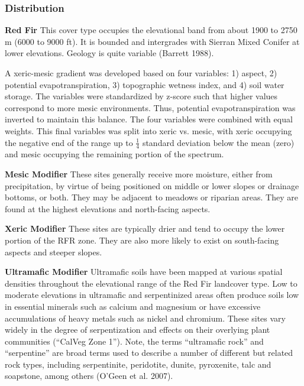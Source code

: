 \subsubsection{Distribution}

\textbf{Red Fir} This cover type occupies the elevational band from about 1900 to 2750 m (6000 to 9000 ft). It is bounded and intergrades with Sierran Mixed Conifer at lower elevations. Geology is quite variable (Barrett 1988).

A xeric-mesic gradient was developed based on four variables: 1) aspect, 2) potential evapotranspiration, 3) topographic wetness index, and 4) soil water storage. The variables were standardized by z-score such that higher values correspond to more mesic environments. Thus, potential evapotranspiration was inverted to maintain this balance. The four variables were combined with equal weights. This final variables was split into xeric vs. mesic, with xeric occupying the negative end of the range up to $\frac{1}{4}$ standard deviation below the mean (zero) and mesic occupying the remaining portion of the spectrum.


\begin{adjustwidth}{2cm}{}
\medskip
\noindent \textbf{Mesic Modifier } These sites generally receive more moisture, either from precipitation, by virtue of being positioned on middle or lower slopes or drainage bottoms, or both. They may be adjacent to meadows or riparian areas. They are found at the highest elevations and north-facing aspects.

\medskip
\noindent \textbf{Xeric Modifier} These sites are typically drier and tend to occupy the lower portion of the RFR zone. They are also more likely to exist on south-facing aspects and steeper slopes.

\medskip
\noindent \textbf{Ultramafic Modifier} Ultramafic soils have been mapped at various spatial densities throughout the elevational range of the Red Fir landcover type. Low to moderate elevations in ultramafic and serpentinized areas often produce soils low in essential minerals such as calcium and magnesium or have excessive accumulations of heavy metals such as nickel and chromium. These sites vary widely in the degree of serpentization and effects on their overlying plant communities (``CalVeg Zone 1''). Note, the terms ``ultramafic rock'' and ``serpentine'' are broad terms used to describe a number of different but related rock types, including serpentinite, peridotite, dunite, pyroxenite, talc and soapstone, among others (O'Geen et al. 2007).

\end{adjustwidth}

